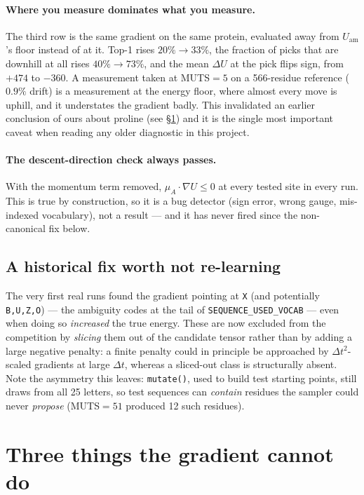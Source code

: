 \documentclass[11pt,a4paper]{article}
\newcommand{\dt}{\Delta t}
\newcommand{\gradU}{\nabla U}
\newcommand{\Uam}{U_{\mathrm{am}}}
\begin{document}
\paragraph{Where you measure dominates what you measure.} The third row is
the same gradient on the same protein, evaluated away from $\Uam$'s floor
instead of at it. Top-1 rises $20\%\rightarrow33\%$, the fraction of picks
that are downhill at all rises $40\%\rightarrow73\%$, and the mean
$\Delta U$ at the pick flips sign, from $+474$ to $-360$. A measurement taken
at MUTS$=5$ on a 566-residue reference ($0.9\%$ drift) is a measurement at
the energy floor, where almost every move is uphill, and it understates the
gradient badly. This invalidated an earlier conclusion of ours about proline
(see \S\ref{sec:negatives}) and it is the single most important caveat when
reading any older diagnostic in this project.

\paragraph{The descent-direction check always passes.} With the momentum term
removed, $\mu_{A}\cdot\gradU \le 0$ at every tested site in every run. This is
true by construction, so it is a bug detector (sign error, wrong gauge,
mis-indexed vocabulary), not a result --- and it has never fired since the
non-canonical fix below.

\subsection{A historical fix worth not re-learning}

The very first real runs found the gradient pointing at \texttt{X} (and
potentially \texttt{B,U,Z,O}) --- the ambiguity codes at the tail of
\texttt{SEQUENCE\_USED\_VOCAB} --- even when doing so \emph{increased} the
true energy. These are now excluded from the competition by \emph{slicing}
them out of the candidate tensor rather than by adding a large negative
penalty: a finite penalty could in principle be approached by
$\dt^{2}$-scaled gradients at large $\dt$, whereas a sliced-out class is
structurally absent. Note the asymmetry this leaves: \texttt{mutate()}, used
to build test starting points, still draws from all 25 letters, so test
sequences can \emph{contain} residues the sampler could never \emph{propose}
(MUTS$=51$ produced 12 such residues).

\section{Three things the gradient cannot do}
\label{sec:negatives}
\end{document}
